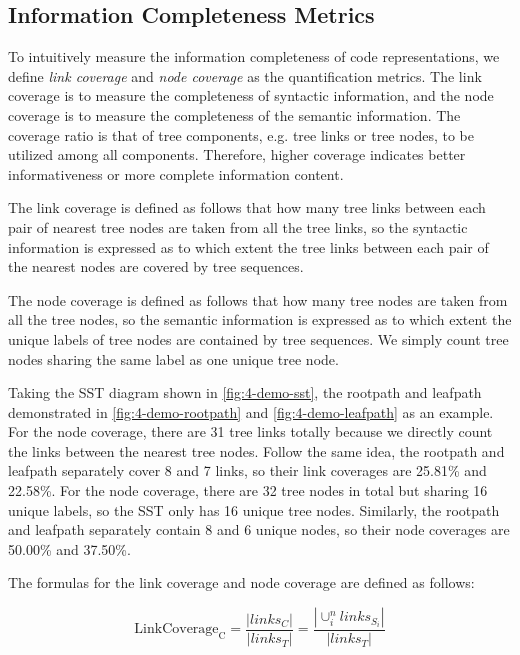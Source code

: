 \documentclass[conference]{IEEEtran}
\begin{document}
\subsection{Information Completeness Metrics}
\label{subsec:metric}

To intuitively measure the information completeness of code representations, we define \emph{link coverage} and \emph{node coverage} as the quantification metrics. The link coverage is to measure the completeness of syntactic information, and the node coverage is to measure the completeness of the semantic information. The coverage ratio is that of tree components, e.g. tree links or tree nodes, to be utilized among all components. Therefore, higher coverage indicates better informativeness or more complete information content.

The link coverage is defined as follows that how many tree links between each pair of nearest tree nodes are taken from all the tree links, so the syntactic information is expressed as to which extent the tree links between each pair of the nearest nodes are covered by tree sequences.


The node coverage is defined as follows that how many tree nodes are taken from all the tree nodes, so the semantic information is expressed as to which extent the unique labels of tree nodes are contained by tree sequences. We simply count tree nodes sharing the same label as one unique tree node.

Taking the SST diagram shown in \autoref{fig:4-demo-sst}, the rootpath and leafpath demonstrated in \autoref{fig:4-demo-rootpath} and \autoref{fig:4-demo-leafpath} as an example. For the node coverage, there are 31 tree links totally because we directly count the links between the nearest tree nodes. Follow the same idea, the rootpath and leafpath separately cover 8 and 7 links, so their link coverages are 25.81\% and 22.58\%. For the node coverage, there are 32 tree nodes in total but sharing 16 unique labels, so the SST only has 16 unique tree nodes. Similarly, the rootpath and leafpath separately contain 8 and 6 unique nodes, so their node coverages are 50.00\% and 37.50\%.

The formulas for the link coverage and node coverage are defined as follows:

\begin{equation}\mathrm{LinkCoverage}_{\mathrm{C}}=\frac{\left|links_{C}\right|}{\left|links_{T}\right|}=\frac{\left|\cup_{i}^{n}{links_{S_i}}\right|}{\left|links_{T}\right|}\end{equation}
\end{document}
